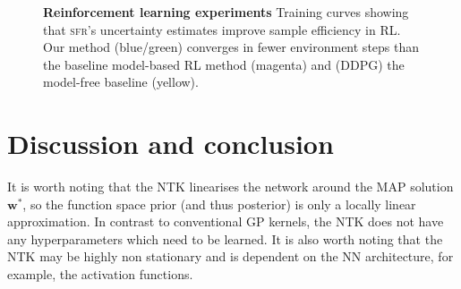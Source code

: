 \documentclass{article}
\newcommand{\our}{\textsc{sfr}\xspace}
\newlength{\figurewidth}
\newlength{\figureheight}
\newcommand{\weights}{\ensuremath{\mathbf{w}}}
\begin{document}
\begin{figure}[!t]
\begin{subfigure}[c]{.24\textwidth}
{\begin{tikzpicture}[inner sep=0,outer sep=0]
 \end{tikzpicture}}
 \end{subfigure}
 \hfill
 \begin{subfigure}[c]{.74\textwidth}
   \centering\scriptsize
   \setlength{\figurewidth}{\textwidth}
   \setlength{\figureheight}{.5\figurewidth}
   
 \end{subfigure}
 \hfill
 \caption{\textbf{Reinforcement learning experiments} Training curves showing that \our's uncertainty estimates improve sample efficiency in RL.
   Our method (blue/green) converges in fewer environment steps than the baseline model-based RL method (magenta) and (DDPG) the model-free baseline  (yellow).}
 \label{fig:rl}
\end{figure}

%





\section{Discussion and conclusion}
\label{sec:conclusion}
%



It is worth noting that the NTK linearises the network around the MAP solution $\weights^{*}$,
so the function space prior (and thus posterior) is only a locally linear approximation.
In contrast to conventional GP kernels, the NTK does not have any hyperparameters which need to be learned.
It is also worth noting that the NTK may be highly non stationary and is dependent on the NN architecture, for example, the activation functions.
\end{document}

